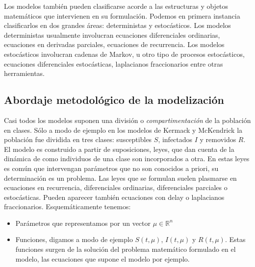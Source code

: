 \documentclass{article}
\begin{document}
 
 Los modelos también pueden clasificarse acorde a las estructuras y objetos matemáticos que intervienen en su formulación. Podemos en primera instancia clasificarlos en dos grandes áreas: deterministas y estocásticos. Los modelos deterministas usualmente involucran ecuaciones diferenciales ordinarias, ecuaciones en derivadas parciales, ecuaciones de recurrencia. Los modelos estocásticos involucran cadenas de Markov, u otro tipo de procesos estocásticos, ecuaciones diferenciales estocásticas, laplacianos fraccionarios entre otras herramientas.  
 
 
 \subsection{Abordaje metodológico de la modelización } \label{metmodel}
 
 
 Casi todos los modelos suponen una división o \emph{compartimentación} de la población en clases. Sólo a modo de ejemplo en los  modelos de  Kermack y McKendrick la población fue dividida en tres clases: susceptibles  $S$, infectados $I$ y removidos $R$.  El modelo es construido a partir de suposiciones, leyes, que dan cuenta de la dinámica de como individuos de una clase son incorporados a otra. En estas leyes es común que  intervengan parámetros que no son conocidos a priori, su determinación es un problema. Las leyes que se formulan suelen plasmarse en ecuaciones en recurrencia, diferenciales ordinarias, diferenciales parciales o estocásticas. Pueden aparecer también ecuaciones con delay o laplacianos fraccionarios. Esquemáticamente tenemos:
 \begin{itemize}
 	\item Parámetros que representamos por un vector $\mu\in\mathbb{R}^n$
 	\item  Funciones, digamos a modo de ejemplo $S(t,\mu)$, $I(t,\mu)$ y $R(t,\mu)$. Estas funciones surgen de la solución del problema matemático formulado en el modelo, las ecuaciones que supone el modelo por ejemplo.
 \end{itemize}
 
\end{document}
